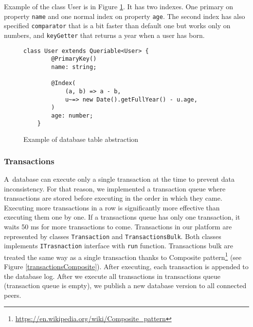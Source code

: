 Example of the class User is in Figure \ref{classExample}. It has two indexes. One primary on property \texttt{name} and one normal index on property \texttt{age}. The second index has also specified \texttt{comparator} that is a bit faster than default one but works only on numbers, and \texttt{keyGetter} that returns a year when a user has born. 

\begin{figure}[h]
    \centering
    \begin{lstlisting}[style=ES6]
    class User extends Queriable<User> {
        @PrimaryKey()
        name: string;

        @Index(
            (a, b) => a - b,
            u~=> new Date().getFullYear() - u.age,
        )
        age: number;
    }
    \end{lstlisting}
    \caption{Example of database table abstraction }
    \label{classExample}
\end{figure}



\subsubsection{Transactions}
A~database can execute only a single transaction at the time to prevent data inconsistency. For that reason, we implemented a transaction queue where transactions are stored before executing in the order in which they came. Executing more transactions in a row is significantly more effective than executing them one by one. If a transactions queue has only one transaction, it waits 50 ms for more transactions to come. Transactions in our platform are represented by classes \texttt{Transaction} and \texttt{TransactionsBulk}. Both classes implements \texttt{ITrasnaction} interface with \texttt{run} function. Transactions bulk are treated the same way as a single transaction thanks to Composite pattern\footnote{\url{https://en.wikipedia.org/wiki/Composite_pattern}} (see Figure \ref{transactionsComposite}). After executing, each transaction is appended to the database log. After we execute all transactions in transactions queue (transaction queue is empty), we publish a new database version to all connected peers.

